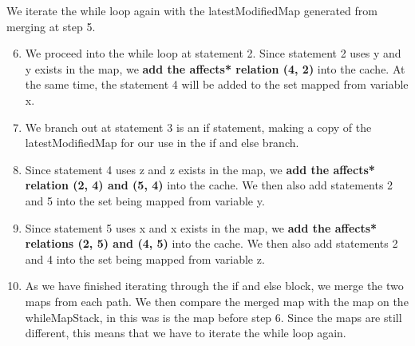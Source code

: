\documentclass[12pt]{article}
\begin{document}
{{{{{{{{{{{{{{\begin{center}
\begin{minipage}{15em}
\begin{flushleft}
\end{flushleft}
\end{minipage}
\hspace{20mm}
\begin{minipage}{20em}
\normalsize
We iterate the while loop again with the latestModifiedMap generated from merging at step 5.
\begin{enumerate}
 \setcounter{enumi}{5}
\item We proceed into the while loop at statement 2. Since statement 2 uses y and y exists in the map, we \textbf{add the affects* relation (4, 2)} into the cache. At the same time, the statement 4 will be added to the set mapped from variable x.
\item We branch out at statement 3 is an if statement, making a copy of the latestModifiedMap for our use in the if and else branch.
\item Since statement 4 uses z and z exists in the map, we \textbf{add the affects* relation (2, 4) and (5, 4)} into the cache. We then also add statements 2 and 5 into the set being mapped from variable y.
\item Since statement 5 uses x and x exists in the map, we \textbf{add the affects* relations (2, 5) and (4, 5)} into the cache. We then also add statements 2 and 4 into the set being mapped from variable z.
\item As we have finished iterating through the if and else block, we merge the two maps from each path. We then compare the merged map with the map on the whileMapStack, in this was is the map before step 6. Since the maps are still different, this means that we have to iterate the while loop again.
\end{enumerate}
\end{minipage}
\end{center}
\normalsize


}}}}}}}}}}}}}}
\end{document}
